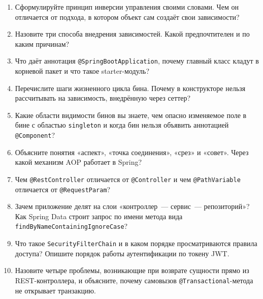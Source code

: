 \begin{enumerate}
\item Сформулируйте принцип инверсии управления своими словами. Чем он
      отличается от подхода, в котором объект сам создаёт свои зависимости?
\item Назовите три способа внедрения зависимостей. Какой предпочтителен и по
      каким причинам?
\item Что даёт аннотация \texttt{@SpringBootApplication}, почему главный класс
      кладут в корневой пакет и что такое starter-модуль?
\item Перечислите шаги жизненного цикла бина. Почему в конструкторе нельзя
      рассчитывать на зависимость, внедрённую через сеттер?
\item Какие области видимости бинов вы знаете, чем опасно изменяемое поле в
      бине с областью \texttt{singleton} и когда бин нельзя объявить
      аннотацией \texttt{@Component}?
\item Объясните понятия «аспект», «точка соединения», «срез» и «совет». Через
      какой механизм AOP работает в Spring?
\item Чем \texttt{@RestController} отличается от \texttt{@Controller} и чем
      \texttt{@PathVariable} отличается от \texttt{@RequestParam}?
\item Зачем приложение делят на слои «контроллер~--- сервис~--- репозиторий»?
      Как Spring Data строит запрос по имени метода вида
      \texttt{findByNameContainingIgnoreCase}?
\item Что такое \texttt{SecurityFilterChain} и в каком порядке просматриваются
      правила доступа? Опишите порядок работы аутентификации по токену JWT.
\item Назовите четыре проблемы, возникающие при возврате сущности прямо из
      REST-контроллера, и объясните, почему самовызов
      \texttt{@Transactional}-метода не открывает транзакцию.
\end{enumerate}

\testzadaniya

